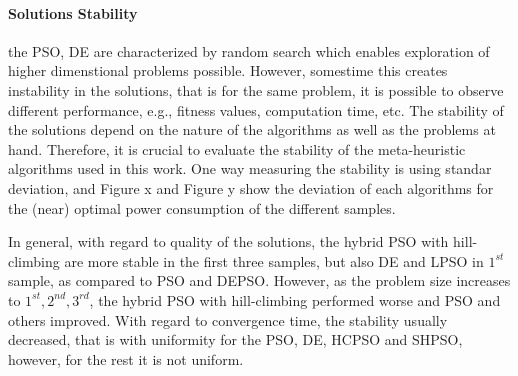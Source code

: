 \paragraph{Solutions Stability} the PSO, DE are characterized by random search which enables exploration of higher dimenstional problems possible. However, somestime this creates instability in the solutions, that is for the same problem, it is possible to observe different performance, e.g., fitness values, computation time, etc. The stability of the solutions depend on the nature of the algorithms as well as the problems at hand. Therefore, it is crucial to evaluate the stability of the meta-heuristic algorithms used in this work. One way measuring the stability is using standar deviation, and Figure x and Figure y show the deviation of each algorithms for the (near) optimal power consumption of the different samples.

In general, with regard to quality of the solutions, the hybrid PSO with hill-climbing are more stable in the first three samples, but also DE and LPSO in $1^{st}$ sample, as compared to PSO and DEPSO. However, as the problem size increases to $1^{st},2^{nd}, 3^{rd}$,  the hybrid PSO with hill-climbing performed worse and PSO and others improved. With regard to convergence time, the stability usually decreased, that is with uniformity for the PSO, DE, HCPSO and SHPSO, however, for the rest it is not uniform.


